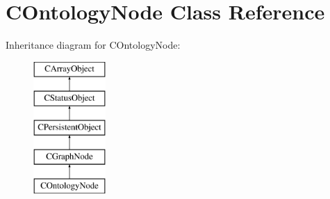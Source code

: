 \hypertarget{class_c_ontology_node}{\section{C\-Ontology\-Node Class Reference}
\label{class_c_ontology_node}
}
Inheritance diagram for C\-Ontology\-Node\-:\begin{figure}[H]
\begin{center}
\leavevmode
\includegraphics[height=5.000000cm]{class_c_ontology_node}
\end{center}
\end{figure}

